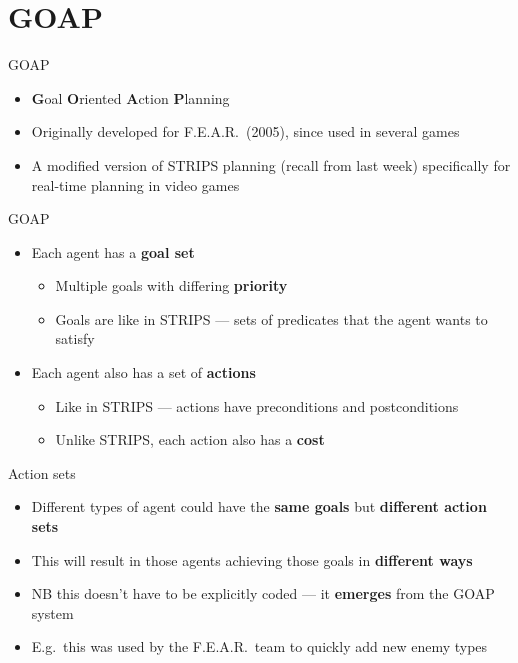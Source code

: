 \part{GOAP}
\frame{\partpage}

\begin{frame}{GOAP}
    \begin{itemize}
        \pause\item \textbf{G}oal \textbf{O}riented \textbf{A}ction \textbf{P}lanning
        \pause\item Originally developed for F.E.A.R.\ (2005), since used in several games
        \pause\item A modified version of STRIPS planning (recall from last week) specifically for real-time planning in video games
    \end{itemize}
\end{frame}

\begin{frame}{GOAP}
    \begin{itemize}
        \pause\item Each agent has a \textbf{goal set}
            \begin{itemize}
                \pause\item Multiple goals with differing \textbf{priority}
                \pause\item Goals are like in STRIPS --- sets of predicates that the agent wants to satisfy
            \end{itemize}
        \pause\item Each agent also has a set of \textbf{actions}
            \begin{itemize}
                \pause\item Like in STRIPS --- actions have preconditions and postconditions
                \pause\item Unlike STRIPS, each action also has a \textbf{cost}
            \end{itemize}
    \end{itemize}
\end{frame}

\begin{frame}{Action sets}
    \begin{itemize}
        \pause\item Different types of agent could have the \textbf{same goals} but \textbf{different action sets}
        \pause\item This will result in those agents achieving those goals in \textbf{different ways}
        \pause\item NB this doesn't have to be explicitly coded --- it \textbf{emerges} from the GOAP system
        \pause\item E.g.\ this was used by the F.E.A.R.\ team to quickly add new enemy types
    \end{itemize}
\end{frame}

